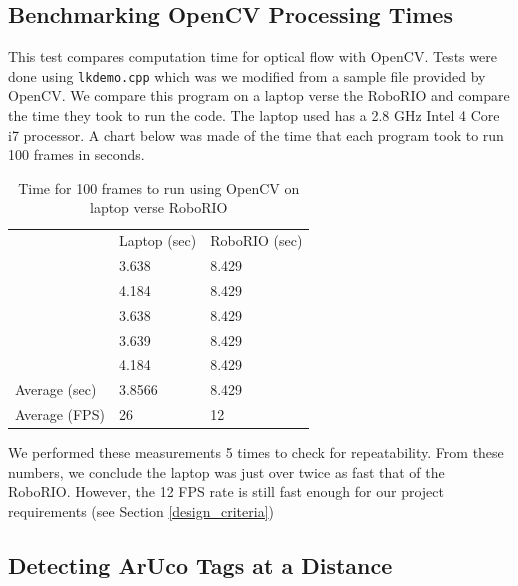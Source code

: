 \documentclass{article}
\begin{document}
  \subsection{Benchmarking OpenCV Processing Times}

    This test compares computation time for optical flow with OpenCV. Tests were done using \texttt{lkdemo.cpp} which was we modified from a sample file provided by OpenCV. We compare this program on a laptop verse the RoboRIO and compare the time they took to run the code. The laptop used has a 2.8 GHz Intel 4 Core i7 processor. A chart below was made of the time that each program took to run 100 frames in seconds.

    \begin{table}[H]
      \centering
      \begin{tabular}{l|l|l|}
        \cline{2-3}
        & Laptop (sec) & RoboRIO (sec) \\
        \cline{2-3}
        & 3.638 & 8.429 \\
        & 4.184 & 8.429\\
        & 3.638 & 8.429 \\
        & 3.639 & 8.429 \\
        & 4.184 & 8.429 \\
        \hline
        \multicolumn{1}{|l|}{Average (sec)} & 3.8566 & 8.429 \\
        \multicolumn{1}{|l|}{Average (FPS)} & 26 & 12 \\
        \hline
      \end{tabular}
      \caption{Time for 100 frames to run using OpenCV on laptop verse RoboRIO}
      \label{table:optical_flow_benchmark}
    \end{table}

    We performed these measurements 5 times to check for repeatability. From these numbers, we conclude the laptop was just over twice as fast that of the RoboRIO. However, the 12 FPS rate is still fast enough for our project requirements (see Section \ref{design_criteria})

  \subsection{Detecting ArUco Tags at a Distance}

\end{document}
